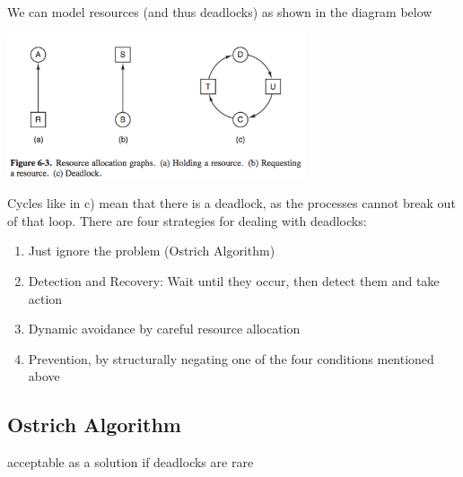 \documentclass{article}
\begin{document}
We can model resources (and thus deadlocks) as shown in the diagram below
\begin{center}
\includegraphics[width= 250pt]{tex/ch6/6-3.png}
\end{center}
Cycles like in c) mean that there is a deadlock, as the processes cannot break out of that loop.
There are four strategies for dealing with deadlocks:
\begin{enumerate}
	\item Just ignore the problem (Ostrich Algorithm)
	\item Detection and Recovery: Wait until they occur, then detect them and take action
	\item Dynamic avoidance by careful resource allocation
	\item Prevention, by structurally negating one of the four conditions mentioned above
\end{enumerate}
\subsection*{Ostrich Algorithm}
acceptable as a solution if deadlocks are rare
\end{document}
